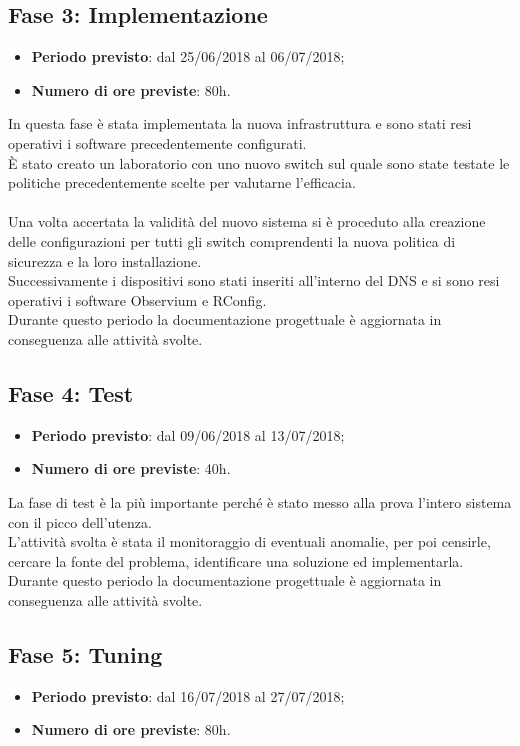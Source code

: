 \documentclass[Tesi.tex]{subfiles}
\begin{document}
\subsection{Fase 3: Implementazione}
\begin{itemize}
	\item \textbf{Periodo previsto}: dal 25/06/2018 al 06/07/2018;
	\item \textbf{Numero di ore previste}: 80h.
\end{itemize}
	
In questa fase è stata implementata la nuova infrastruttura e sono stati resi operativi i software precedentemente configurati. \\
\`{E} stato creato un laboratorio con uno nuovo switch sul quale sono state testate le politiche precedentemente scelte per valutarne l'efficacia.\\\\
Una volta accertata la validità del nuovo sistema si è proceduto alla creazione delle configurazioni per tutti gli switch comprendenti la nuova politica di sicurezza e la loro installazione. \\
Successivamente i dispositivi sono stati inseriti all'interno del DNS e si sono resi operativi i software Observium e RConfig. \\
Durante questo periodo la documentazione progettuale è aggiornata in conseguenza alle attività svolte.


\subsection{Fase 4: Test}
\begin{itemize}
	\item \textbf{Periodo previsto}: dal 09/06/2018 al 13/07/2018;
	\item \textbf{Numero di ore previste}: 40h.
\end{itemize}
	
La fase di test è la più importante perché è stato messo alla prova l'intero sistema con il picco dell'utenza. \\
L'attività svolta è stata il monitoraggio di eventuali anomalie, per poi censirle, cercare la fonte del problema, identificare una soluzione ed implementarla. \\
Durante questo periodo la documentazione progettuale è aggiornata in conseguenza alle attività svolte.

	

\subsection{Fase 5: Tuning}
\begin{itemize}
	\item \textbf{Periodo previsto}: dal 16/07/2018 al 27/07/2018;
	\item \textbf{Numero di ore previste}: 80h.
\end{itemize}
	
\end{document}
